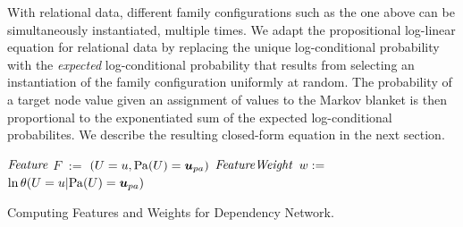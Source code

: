 \documentclass[runningheads,a4paper]{llncs}
\begin{document}
With relational data, different family configurations such as the one above can be simultaneously instantiated, multiple times.  We adapt the propositional log-linear equation for relational data by replacing the unique log-conditional probability with the {\em expected} log-conditional probability that results from selecting an instantiation of the family configuration uniformly at random. The probability of a target node value given an assignment of values to the Markov blanket is then proportional to the exponentiated sum of the expected log-conditional probabilites. %
We describe the resulting closed-form equation in the next section.




\begin{algorithm}[htbp]
{}
\begin{algorithmic}[1]
			\STATE $\it{Feature}$ $F$  $:=$ $(\Appendterm{\UT  = \UV} {\Pa{\UT} = \Prange{\UT}})$ 
			\STATE  $\it{FeatureWeight} $ $w:=$ $\ln\cprob{\UT = \UV}{\Pa{\UT} = \Prange{\UT}}$
			\ENDIF \\	
		\ENDFOR
	\ENDFOR
\ENDFOR 
\ENDFOR
\STATE {}
\end{algorithmic}
\caption{Computing Features and Weights for Dependency Network. \label{alg:dnfeatures}
}
\end{algorithm}
\end{document}
